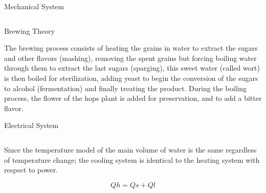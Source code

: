 \documentclass[final]{beamer}
\newlength{\onecolwid}
\newlength{\twocolwid}
\begin{document}
\begin{frame}[t]
\begin{columns}[t]
\begin{column}{\twocolwid}
\begin{block}{Mechanical System}
\begin{columns}[t,totalwidth=\twocolwid]
\begin{column}{\onecolwid}

\end{column} %

\end{columns} %
\end{block}


\begin{alertblock}{Brewing Theory}

The brewing process consists of heating the grains in water to extract the sugars and other flavors (mashing), removing the spent grains but forcing boiling water through them to extract the last sugars (sparging), this sweet water (called wort) is then boiled for sterilization, adding yeast to begin the conversion of the sugars to alcohol (fermentation) and finally treating the product.  During the boiling process, the flower of the hops plant is added for preservation, and to add a bitter flavor.

\end{alertblock} 


\begin{block}{Electrical System}

\begin{columns}[t,totalwidth=\twocolwid] %

\begin{column}{\onecolwid} %
\vspace{-.3in}
\begin{justify}
Since the temperature model of the main volume of water is the same regardless of  temperature change; the cooling system is identical to the heating system with respect to power.

\begin{equation}
Qh = Qs + Ql
\label{eq:heat-system}
\end{equation}


\end{justify}
\end{column}
\end{columns}
\end{block}
\end{column}
\end{columns}
\end{frame}
\end{document}
